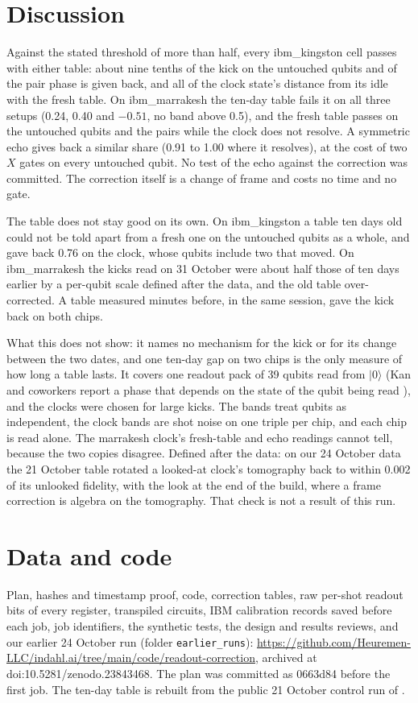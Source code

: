 \documentclass[reprint,amsmath,amssymb,aps,superscriptaddress,nofootinbib]{revtex4-2}
\begin{document}
\section{Discussion}

Against the stated threshold of more than half, every ibm\_kingston cell passes with either table: about nine tenths of the kick on the untouched qubits and of the pair phase is given back, and all of the clock state's distance from its idle with the fresh table. On ibm\_marrakesh the ten-day table fails it on all three setups (0.24, 0.40 and $-0.51$, no band above 0.5), and the fresh table passes on the untouched qubits and the pairs while the clock does not resolve. A symmetric echo gives back a similar share (0.91 to 1.00 where it resolves), at the cost of two $X$ gates on every untouched qubit. No test of the echo against the correction was committed. The correction itself is a change of frame and costs no time and no gate.

The table does not stay good on its own. On ibm\_kingston a table ten days old could not be told apart from a fresh one on the untouched qubits as a whole, and gave back 0.76 on the clock, whose qubits include two that moved. On ibm\_marrakesh the kicks read on 31 October were about half those of ten days earlier by a per-qubit scale defined after the data, and the old table over-corrected. A table measured minutes before, in the same session, gave the kick back on both chips.

What this does not show: it names no mechanism for the kick or for its change between the two dates, and one ten-day gap on two chips is the only measure of how long a table lasts. It covers one readout pack of 39 qubits read from $|0\rangle$ (Kan and coworkers report a phase that depends on the state of the qubit being read \cite{Kan2026}), and the clocks were chosen for large kicks. The bands treat qubits as independent, the clock bands are shot noise on one triple per chip, and each chip is read alone. The marrakesh clock's fresh-table and echo readings cannot tell, because the two copies disagree. Defined after the data: on our 24 October data the 21 October table rotated a looked-at clock's tomography back to within 0.002 of its unlooked fidelity, with the look at the end of the build, where a frame correction is algebra on the tomography. That check is not a result of this run.

\section*{Data and code}
Plan, hashes and timestamp proof, code, correction tables, raw per-shot readout bits of every register, transpiled circuits, IBM calibration records saved before each job, job identifiers, the synthetic tests, the design and results reviews, and our earlier 24 October run (folder \texttt{earlier\_runs}): \url{https://github.com/Heuremen-LLC/indahl.ai/tree/main/code/readout-correction}, archived at doi:10.5281/zenodo.23843468. The plan was committed as 0663d84 before the first job. The ten-day table is rebuilt from the public 21 October control run of \cite{readout}.
\end{document}
